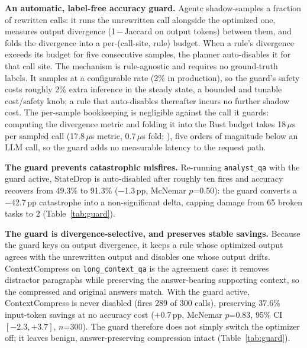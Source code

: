 \documentclass[sigconf,9pt]{acmart}
\begin{document}
\textbf{An automatic, label-free accuracy guard.} Agentc shadow-samples a fraction of
rewritten calls: it runs the unrewritten call alongside the optimized one, measures
output divergence (1\,$-$\,Jaccard on output tokens) between them, and folds the
divergence into a per-(call-site, rule) budget. When a rule's divergence exceeds its
budget for five consecutive samples, the planner auto-disables it for that call site.
The mechanism is rule-agnostic and requires no ground-truth labels. It samples at a
configurable rate (2\% in production), so the guard's safety costs roughly 2\% extra
inference in the steady state, a bounded and tunable cost/safety knob; a rule that
auto-disables thereafter incurs no further shadow cost. The per-sample bookkeeping is
negligible against the call it guards: computing the divergence metric and folding it into
the Rust budget takes 18\,$\mu$s per sampled call (17.8\,$\mu$s metric, 0.7\,$\mu$s fold;
), five orders of magnitude below an LLM call, so the
guard adds no measurable latency to the request path.

\textbf{The guard prevents catastrophic misfires.} Re-running \texttt{analyst\_qa} with
the guard active, StateDrop is auto-disabled after roughly ten fires and accuracy
recovers from 49.3\% to 91.3\% ($-$1.3\,pp, McNemar $p$=0.50): the guard converts a
$-$42.7\,pp catastrophe into a non-significant delta, capping damage from 65 broken
tasks to 2 (Table~\ref{tab:guard}).

\textbf{The guard is divergence-selective, and preserves stable savings.} Because the
guard keys on output divergence, it keeps a rule whose optimized output agrees with the
unrewritten output and disables one whose output drifts. ContextCompress on
\texttt{long\_context\_qa} is the agreement case: it removes distractor paragraphs while
preserving the answer-bearing supporting context, so the compressed and original answers
match. With the guard active, ContextCompress is never disabled (fires 289 of 300 calls),
preserving 37.6\% input-token savings at no accuracy cost ($+$0.7\,pp, McNemar $p$=0.83,
95\% CI $[-2.3,+3.7]$, $n$=300). The guard therefore does not simply switch the optimizer
off; it leaves benign, answer-preserving compression intact (Table~\ref{tab:guard}).
\end{document}
